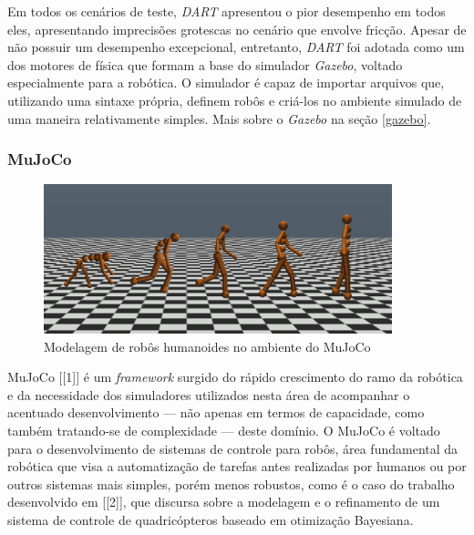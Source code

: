 \documentclass[cic,tc]{iiufrgs}
\begin{document}
Em todos os cenários de teste, \textit{DART} apresentou o pior desempenho em
todos eles, apresentando imprecisões grotescas no cenário que envolve fricção.
Apesar de não possuir um desempenho excepcional, entretanto, \textit{DART} foi
adotada como
um dos motores de física que formam a base do simulador \textit{Gazebo}, voltado
especialmente para a robótica. O simulador é capaz de importar arquivos que,
utilizando uma sintaxe própria, definem robôs e criá-los no ambiente simulado de
uma maneira relativamente simples. Mais sobre o \textit{Gazebo} na seção
\ref{gazebo}.

\subsubsection{MuJoCo}

\label{mujoco}

\begin{figure}[h]
    \caption{Modelagem de robôs humanoides no ambiente do MuJoCo}
    \begin{center}
      \includegraphics[width=0.9\textwidth]{mujoco_humanoids.png}
    \end{center}
    \label{fig:humanoids_mujoco}
\end{figure}

MuJoCo [[1]] é um \textit{framework} surgido do rápido crescimento do ramo da
robótica e da necessidade dos simuladores utilizados nesta área de acompanhar
o acentuado desenvolvimento --- não apenas em termos de capacidade, como também
tratando-se de complexidade --- deste domínio. O MuJoCo é voltado para o
desenvolvimento de sistemas de controle para robôs, área fundamental da robótica
que visa a automatização de tarefas antes realizadas por humanos ou por outros
sistemas mais simples, porém menos robustos, como é o caso do trabalho
desenvolvido em [[2]], que discursa sobre a modelagem e o refinamento de um
sistema de controle de quadricópteros baseado em otimização Bayesiana.
\end{document}
